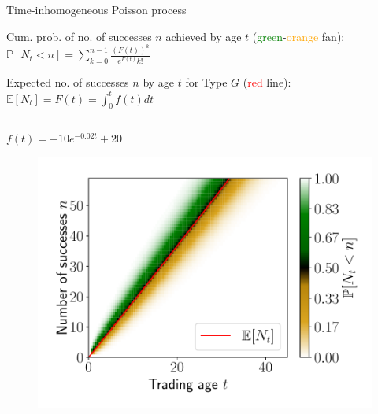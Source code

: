 \documentclass{beamer}
\begin{document}
\begin{frame}[allowframebreaks]{Time-inhomogeneous Poisson process}
\framebreak

Cum. prob. of no. of successes $n$ achieved by age $t$
(\textcolor{green}{green}-\textcolor{orange}{orange} fan):
$\mathbb{P}[N_t < n]
=  \sum_{k=0}^{n-1} \frac{\left(F(t)\right)^k}{e^{F(t)}k!}$

Expected no. of successes $n$ by age $t$ for Type $G$
(\textcolor{red}{red}
line):
$\mathbb{E}[N_{t}] = F(t)=\int_0^t f(t) dt$

	\begin{columns}[t]
		\begin{column}{0.49\textwidth}
			\begin{block}{$f(t)=-10e^{-0.02t}+20$}
				\begin{figure}
					\includegraphics[width=\linewidth]{figures/probn2}
				\end{figure}
			\end{block}  
		\end{column}
		

\end{columns}
\end{frame}
\end{document}
